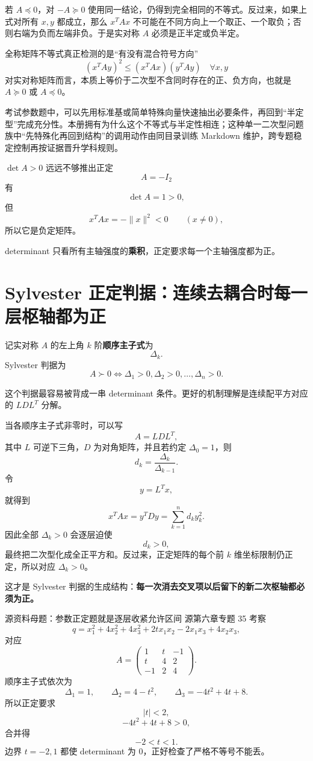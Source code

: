 \documentclass[11pt,a4paper]{ctexart}
\newcommand{\kw}[1]{\textbf{\color{deep}#1}}
\begin{document}
若 $A\preceq0$，对 $-A\succeq0$ 使用同一结论，仍得到完全相同的不等式。反过来，如果上式对所有 $x,y$ 都成立，那么 $x^TAx$ 不可能在不同方向上一个取正、一个取负；否则右端为负而左端非负。于是实对称 $A$ 必须是正半定或负半定。

\begin{corebox}{全称矩阵不等式真正检测的是“有没有混合符号方向”}
\[
\boxed{
(x^TAy)^2\le (x^TAx)(y^TAy)\quad\forall x,y
}
\]
对实对称矩阵而言，本质上等价于二次型不含同时存在的正、负方向，也就是 $A\succeq0$ 或 $A\preceq0$。

考试参数题中，可以先用标准基或简单特殊向量快速抽出必要条件，再回到“半定型”完成充分性。本册拥有为什么这个不等式与半定性相连；这种单一二次型问题族中“先特殊化再回到结构”的调用动作由同目录训练 Markdown 维护，跨专题稳定控制再按证据晋升学科规则。
\end{corebox}

\begin{warnbox}{$\det A>0$ 远远不够推出正定}
\[
A=-I_2
\]
有
\[
\det A=1>0,
\]
但
\[
x^TAx=-\lVert x\rVert^2<0\qquad(x\neq0),
\]
所以它是负定矩阵。

determinant 只看所有主轴强度的\kw{乘积}，正定要求每一个主轴强度都为正。
\end{warnbox}

\section{Sylvester 正定判据：连续去耦合时每一层枢轴都为正}

记实对称 $A$ 的左上角 $k$ 阶\kw{顺序主子式}为
\[
\Delta_k.
\]
Sylvester 判据为
\[
\boxed{
A\succ0
\iff
\Delta_1>0,\Delta_2>0,\dots,\Delta_n>0.
}
\]

这个判据最容易被背成一串 determinant 条件。更好的机制理解是连续配平方对应的 $LDL^T$ 分解。

当各顺序主子式非零时，可以写
\[
A=LDL^T,
\]
其中 $L$ 可逆下三角，$D$ 为对角矩阵，并且若约定 $\Delta_0=1$，则
\[
\boxed{d_k=\frac{\Delta_k}{\Delta_{k-1}}.}
\]
令
\[
y=L^Tx,
\]
就得到
\[
x^TAx=y^TDy=\sum_{k=1}^{n}d_ky_k^2.
\]
因此全部 $\Delta_k>0$ 会逐层迫使
\[
d_k>0,
\]
最终把二次型化成全正平方和。反过来，正定矩阵的每个前 $k$ 维坐标限制仍正定，所以对应 $\Delta_k>0$。

这才是 Sylvester 判据的生成结构：\kw{每一次消去交叉项以后留下的新二次枢轴都必须为正。}

\begin{examplebox}{源资料母题：参数正定题就是逐层收紧允许区间}
源第六章专题 35 考察
\[
q=x_1^2+4x_2^2+4x_3^2+2t x_1x_2-2x_1x_3+4x_2x_3,
\]
对应
\[
A=\begin{pmatrix}1&t&-1\\t&4&2\\-1&2&4\end{pmatrix}.
\]
顺序主子式依次为
\[
\Delta_1=1,
\qquad
\Delta_2=4-t^2,
\qquad
\Delta_3=-4t^2+4t+8.
\]
所以正定要求
\[
\lvert t\rvert<2,
\]
\[
-4t^2+4t+8>0,
\]
合并得
\[
\boxed{-2<t<1}.
\]
边界 $t=-2,1$ 都使 determinant 为 $0$，正好检查了严格不等号不能丢。
\end{examplebox}
\end{document}
